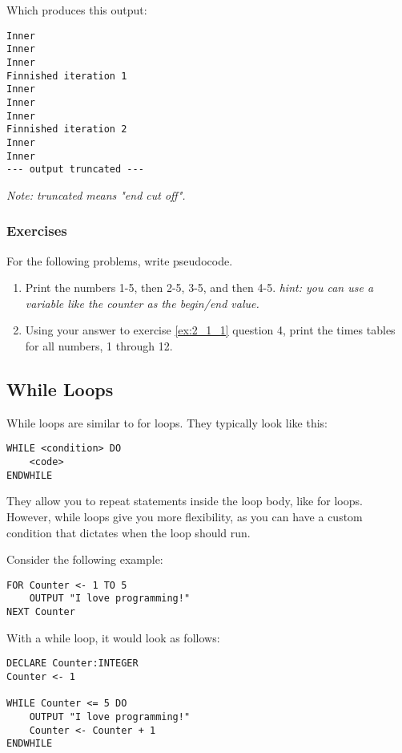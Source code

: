 \documentclass[./main.tex]{subfiles}
\begin{document}
Which produces this output:

\begin{verbatim}
Inner
Inner
Inner
Finnished iteration 1
Inner
Inner
Inner
Finnished iteration 2
Inner
Inner
--- output truncated ---
\end{verbatim}
\emph{Note: truncated means "end cut off".}

\newpage
\subsubsection{Exercises}
\label{ex:2_2_1}

For the following problems, write pseudocode.

\begin{enumerate}
    \item Print the numbers 1-5, then 2-5, 3-5, and then 4-5. \emph{hint: you can use a variable like the counter as the begin/end value.}
        \mediumlines

    \item Using your answer to exercise \ref{ex:2_1_1} question 4, print the times tables for all numbers, 1 through 12.
        \mediumlines
\end{enumerate}

\newpage
\subsection{While Loops}

While loops are similar to for loops. They typically look like this:

\begin{verbatim}
WHILE <condition> DO
    <code>
ENDWHILE
\end{verbatim}

They allow you to repeat statements inside the loop body, like for loops. However, while loops give you more flexibility, as you can have a custom condition that dictates when the loop should run.

Consider the following example:

\begin{verbatim}
FOR Counter <- 1 TO 5
    OUTPUT "I love programming!"
NEXT Counter
\end{verbatim}

With a while loop, it would look as follows:

\begin{verbatim}
DECLARE Counter:INTEGER
Counter <- 1

WHILE Counter <= 5 DO
    OUTPUT "I love programming!"
    Counter <- Counter + 1
ENDWHILE
\end{verbatim}
\end{document}
